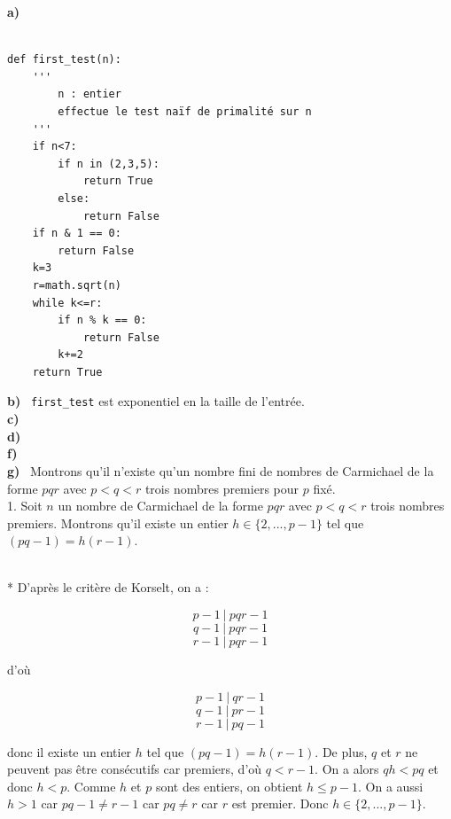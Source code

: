\documentclass[a4paper]{article}
\newcommand{\question}[1]{\noindent \textbf{#1}~}
\newenvironment{myproof}[1][\proofname]{\proof[#1]\mbox{}\\*}{\endproof}
\begin{document}
\question{a)}
\begin{lstlisting}[frame=single]  % Start your code-block

def first_test(n):
    '''
        n : entier
        effectue le test naïf de primalité sur n
    '''
    if n<7:
        if n in (2,3,5):
            return True
        else:
            return False
    if n & 1 == 0:
        return False
    k=3
    r=math.sqrt(n)
    while k<=r:
        if n % k == 0:
            return False
        k+=2
    return True
\end{lstlisting}

\question{b)} \texttt{first\_test} est exponentiel en la taille de l'entrée.\\

\question{c)} \\
\question{d)} \\
\question{f)} \\

\question{g)} Montrons qu'il n'existe qu'un nombre fini de nombres de Carmichael
de la forme $pqr$ avec $p < q < r$ trois nombres premiers pour $p$ fixé. \\

1. Soit $n$ un nombre de Carmichael de la forme $pqr$ avec $p < q < r$ trois
nombres premiers. Montrons qu'il existe un entier $h \in \{2,...,p-1\}$ tel que
$(pq - 1) = h(r - 1)$.

\begin{myproof}
D'après le critère de Korselt, on a :

$$ p-1\ |\ pqr-1$$
$$ q-1\ |\ pqr-1$$
$$ r-1\ |\ pqr-1$$

d'où 

\begin{equation} p-1\ |\ qr-1\label{div_p}\end{equation}
\begin{equation} q-1\ |\ pr-1\label{div_q}\end{equation}
\begin{equation} r-1\ |\ pq-1\label{div_r}\end{equation}

donc il existe un entier $h$ tel que $(pq-1) = h(r-1)$. De plus, $q$ et $r$ ne
peuvent pas être consécutifs car premiers, d'où $q < r-1$. On a alors $qh < pq$
et donc $h < p$. Comme $h$ et $p$ sont des entiers, on obtient $h \leq p-1$. On a
aussi $h > 1$ car $pq - 1 \neq r - 1$ car $pq \neq r$ car $r$ est premier. Donc
$h \in \{2,...,p-1\}$.\\

\end{myproof}
\end{document}
